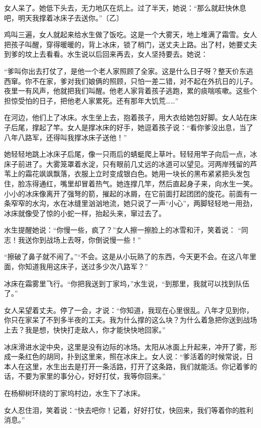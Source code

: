 \documentclass{ctexart}
\begin{document}
女人呆了。她低下头去，无力地仄在炕上。过了半天，她说：“那么就赶快休息吧，明天我撑着冰床子去送你。”〔乙〕

鸡叫三遍，女人就起来给水生做了饭吃。这是一个大雾天，地上堆满了霜雪。女人把孩子叫醒，穿得暖暖的，背上冰床，锁了梢门，送丈夫上路。出了村，她要丈夫到爹的坟上去看看。水生说以后回来再去，女人坚持要去。她说：

“爹叫你出去打仗了，是他一个老人家照顾了全家。这是什么日子呀？整天价东逃西窜。你不在家，爹对我们娘俩的照顾，只怕一差二错，对不起在外抗日的儿子。夜里一有风声，他就把我们叫醒。他老人家背着孩子逃跑，累的痰喘咳嗽。这些个担惊受怕的日子，把他老人家累死。还有那年大饥荒……”

在河边，他们上了冰床。水生坐上去，抱着孩子，用大衣给她包好脚。女人站在床子后尾，撑起了竿。女人是撑冰床的好手，她逗着孩子说：“看你爹没出息，当了八年八路军，还得叫我撑冰床子送他！”

她轻轻地跳上冰床子后尾，像一只雨后的蜻蜓爬上草叶。轻轻用竿子向后一点，冰床子前进了。大雾笼罩着水淀，只有眼前几丈远的冰道可以望见。河两岸残留的芦苇上的霜花飒飒飘落，衣服上立时变成银白色。她用一块长的黑布紧紧把头发包住，脸冻得通红，嘴里却冒着热气。她连撑几竿，然后直起身子来，向水生一笑。小小的冰床像离开了强弩的箭，摧起的冰屑，在它前面打起团团的旋花。前面有一条窄窄的水沟，水在冰缝里汹汹地流，她只说了一声“小心”，两脚轻轻地一用劲，冰床就像受了惊的小蛇一样，抬起头来，窜过去了。

水生提醒她说：“你慢一些，疯了？”女人擦一擦脸上的冰雪和汗，笑着说： “同志！我送你到战场上去呀，你倒说慢一些！”

“擦破了鼻子就不闹了。”“不会。这是从小玩熟了的东西，今天更不会。在这八年里面，你知道我用这床子，送过多少次八路军？”

冰床在霜雾里飞行。“你把我送到丁家坞，”水生说，“到那里，我就可以找到队伍了。”

女人呆望着丈夫。停了一会，才说：“你知道，我现在心里很乱。八年才见到你，你只在家呆了不到多半夜的工夫。我为什么撑的这么块？为什么着急把你送到战场上去？我是想，快快打走敌人，你才能快快地回家。”

冰床滑进水淀中央，这里是没有边际的冰场。太阳从冰面上升起来，冲开了雾，形成一条红色的胡同，扑到这里来，照在冰床上。女人说：“爹活着的时候常说，日本人在这里，水生出去是打开一条活路，打开了这条路，我们就能活。你记着爹的话，不要为家里的事分心，好好打仗，我等你回来。”

在杨柳树环绕的丁家坞村边，水生下了冰床。

女人忍住泪，笑着说：“快去吧你！记着，好好打仗，快回来，我们等着你的胜利消息。”

\end{document}
